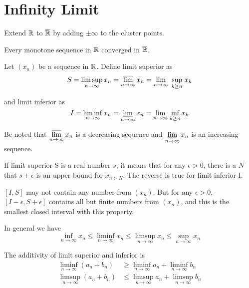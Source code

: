 \section{Infinity Limit}

Extend $\mathbb{R}$ to $\overline{\mathbb{R}}$ by adding $\pm \infty$ to the cluster points.

\begin{theorem}
    Every monotone sequence in $\mathbb{R}$ converged in $\overline{\mathbb{R}}$.
\end{theorem}


\begin{definition}
    Let $(x_n)$ be a sequence in $\mathbb{R}$. Define limit superior as
    \begin{equation}
        S = \limsup_{n \rightarrow \infty} x_n = \varlimsup_{n\rightarrow \infty} x_n = \lim_{n \rightarrow \infty} \underset{k \geq n}{\text{ sup }} x_k
    \end{equation}
    
    and limit inferior as
    \begin{equation}
        I = \liminf_{n \rightarrow \infty} x_n = \varliminf_{n\rightarrow \infty} x_n = \lim_{n \rightarrow \infty} \underset{k \geq n}{\text{ inf }} x_k
    \end{equation}    
\end{definition}

Be noted that $\displaystyle \varlimsup_{n\rightarrow \infty} x_n$ is a decreasing sequence and $\displaystyle \varliminf_{n\rightarrow \infty} x_n$ is an increasing sequence.


If limit superior S is a real number $s$, it means that for any $\epsilon>0$, there is a $N$ that $s + \epsilon$ is an upper bound for $x_{n > N}$. The reverse is true for limit inferior I.

$[I,S]$ may not contain any number from $(x_n)$. But for any $\epsilon >0$, $[I - \epsilon, S + \epsilon]$ contains all but finite numbers from $(x_n)$, and this is the smallest closed interval with this property.

In general we have 
\begin{equation}
    \inf_{n \rightarrow \infty} x_n \leq \liminf_{n \rightarrow \infty} x_n \leq \limsup_{n \rightarrow \infty} x_n \leq \sup_{n \rightarrow \infty} x_n
\end{equation}

The additivity of limit superior and inferior is
\begin{equation}
    \begin{aligned}
        \liminf_{n \rightarrow \infty} (a_n + b_n) &\geq \liminf_{n \rightarrow \infty} a_n + \liminf_{n \rightarrow \infty} b_n \\
        \limsup_{n \rightarrow \infty} (a_n + b_n) &\leq \limsup_{n \rightarrow \infty} a_n + \limsup_{n \rightarrow \infty} b_n \\
    \end{aligned}
\end{equation}


